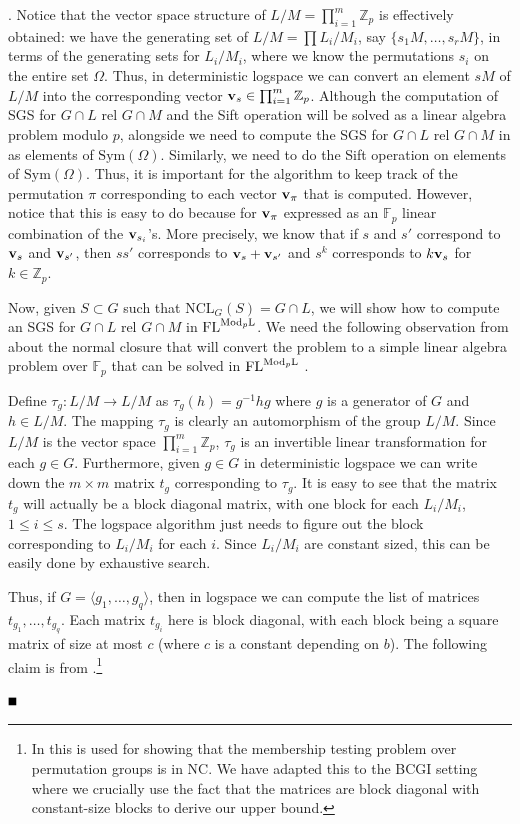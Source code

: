 \documentclass[11pt]{article}
\newcommand{\bproof}{\noindent{\it Proof}}
\newcommand{\eproof}{\hspace*{\fill}$\rule{2mm}{2mm}$~~~~~\bigskip}
\renewenvironment{proof}{\bproof. }{\eproof}
\newcommand{\Mod}[1]{\ensuremath{\mathrm{Mod}_{#1}\mathrm{L}}}
\newcommand{\FL}{\mbox{\rm FL}}
\newcommand{\NCL}[2]{\ensuremath{\mathrm{NCL}_{#1}({#2})}}
\newcommand{\Z}{\mathbb{Z}}
\newcommand{\F}{\ensuremath{\mathbb{F}}}
\renewcommand{\v}{\mbox{\bf v}}
\renewcommand{\angle}[1]{\langle #1\rangle}
\newcommand{\Sym}[1]{\ensuremath{\mathrm{Sym}\left({#1}\right)}}
\begin{document}
\begin{proof}
Notice that the vector space structure of $L/M=\prod_{i=1}^m \Z_p$ is
effectively obtained: we have the generating set of $L/M=\prod
L_i/M_i$, say $\{s_1M,\ldots,s_rM\}$, in terms of the generating sets
for $L_i/M_i$, where we know the permutations $s_i$ on the entire set
$\Omega$. Thus, in deterministic logspace we can convert an element
$sM$ of $L/M$ into the corresponding vector $\v_s\in\prod_{i=1}^m
\Z_p$. Although the computation of SGS for $G\cap L$ rel $G\cap M$ and
the Sift operation will be solved as a linear algebra problem modulo
$p$, alongside we need to compute the SGS for $G\cap L$ rel $G\cap M$
in as elements of $\Sym{\Omega}$. Similarly, we need to do the Sift
operation on elements of $\Sym{\Omega}$. Thus, it is important for the
algorithm to keep track of the permutation $\pi$ corresponding to each
vector $\v_{\pi}$ that is computed. However, notice that this is easy
to do because for $\v_{\pi}$ expressed as an $\F_p$ linear combination
of the $\v_{s_i}$'s. More precisely, we know that if $s$ and $s'$
correspond to $\v_s$ and $\v_{s'}$, then $ss'$ corresponds to
$\v_s+\v_{s'}$ and $s^k$ corresponds to $k\v_s$ for $k\in\Z_p$.

Now, given $S\subset G$ such that $\NCL{G}{S} = G \cap L$, we will
show how to compute an SGS for $G \cap L$ rel $G \cap M$ in
$\FL^{\Mod{p}}$. We need the following observation from \cite{LM}
about the normal closure that will convert the problem to a simple
linear algebra problem over $\F_p$ that can be solved in
$\FL^{\Mod{p}}$ \cite{allender99complexity,DH}.

Define $\tau_g:L/M\rightarrow L/M$ as $\tau_g(h)=g^{-1}hg$ where $g$
is a generator of $G$ and $h\in L/M$.  The mapping $\tau_g$ is clearly
an automorphism of the group $L/M$. Since $L/M$ is the vector space
$\prod_{i=1}^m \Z_p$, $\tau_g$ is an invertible linear transformation
for each $g\in G$. Furthermore, given $g\in G$ in deterministic
logspace we can write down the $m\times m$ matrix $t_g$ corresponding
to $\tau_g$. It is easy to see that the matrix $t_g$ will actually be
a block diagonal matrix, with one block for each $L_i/M_i$, $1\leq
i\leq s$. The logspace algorithm just needs to figure out the block
corresponding to $L_i/M_i$ for each $i$. Since $L_i/M_i$ are constant
sized, this can be easily done by exhaustive search. 

Thus, if $G=\angle{g_1,\ldots,g_q}$, then in logspace we can compute
the list of matrices $t_{g_1},\ldots,t_{g_q}$. Each matrix $t_{g_i}$
here is block diagonal, with each block being a square matrix of size
at most $c$ (where $c$ is a constant depending on $b$). The following
claim is from \cite{LM}.\footnote{In \cite{LM} this is used for
showing that the membership testing problem over permutation groups is
in NC. We have adapted this to the BCGI setting where we crucially use
the fact that the matrices are block diagonal with constant-size
blocks to derive our upper bound.}


\end{proof}
\end{document}
